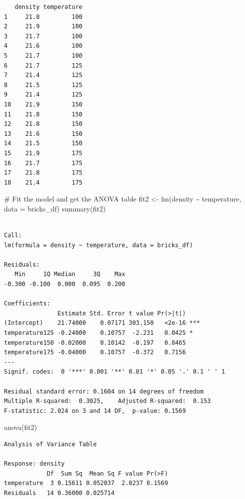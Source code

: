 \documentclass[
  letterpaper,
  DIV=11,
  numbers=noendperiod]{scrreprt}
\newenvironment{Shaded}{\begin{snugshade}}{\end{snugshade}}
\newcommand{\AttributeTok}[1]{\textcolor[rgb]{0.40,0.45,0.13}{#1}}
\newcommand{\CommentTok}[1]{\textcolor[rgb]{0.37,0.37,0.37}{#1}}
\newcommand{\FunctionTok}[1]{\textcolor[rgb]{0.28,0.35,0.67}{#1}}
\newcommand{\NormalTok}[1]{\textcolor[rgb]{0.00,0.23,0.31}{#1}}
\newcommand{\OtherTok}[1]{\textcolor[rgb]{0.00,0.23,0.31}{#1}}
\newcommand{\SpecialCharTok}[1]{\textcolor[rgb]{0.37,0.37,0.37}{#1}}
\begin{document}
\begin{verbatim}
   density temperature
1     21.8         100
2     21.9         100
3     21.7         100
4     21.6         100
5     21.7         100
6     21.7         125
7     21.4         125
8     21.5         125
9     21.4         125
10    21.9         150
11    21.8         150
12    21.8         150
13    21.6         150
14    21.5         150
15    21.9         175
16    21.7         175
17    21.8         175
18    21.4         175
\end{verbatim}

\begin{Shaded}
\begin{Highlighting}[]
\CommentTok{\# Fit the model and get the ANOVA table}
\NormalTok{fit2 }\OtherTok{\textless{}{-}} \FunctionTok{lm}\NormalTok{(density }\SpecialCharTok{\textasciitilde{}}\NormalTok{ temperature, }\AttributeTok{data =}\NormalTok{ bricks\_df)}
\FunctionTok{summary}\NormalTok{(fit2)}
\end{Highlighting}
\end{Shaded}

\begin{verbatim}

Call:
lm(formula = density ~ temperature, data = bricks_df)

Residuals:
   Min     1Q Median     3Q    Max 
-0.300 -0.100  0.000  0.095  0.200 

Coefficients:
               Estimate Std. Error t value Pr(>|t|)    
(Intercept)    21.74000    0.07171 303.150   <2e-16 ***
temperature125 -0.24000    0.10757  -2.231   0.0425 *  
temperature150 -0.02000    0.10142  -0.197   0.8465    
temperature175 -0.04000    0.10757  -0.372   0.7156    
---
Signif. codes:  0 '***' 0.001 '**' 0.01 '*' 0.05 '.' 0.1 ' ' 1

Residual standard error: 0.1604 on 14 degrees of freedom
Multiple R-squared:  0.3025,    Adjusted R-squared:  0.153 
F-statistic: 2.024 on 3 and 14 DF,  p-value: 0.1569
\end{verbatim}

\begin{Shaded}
\begin{Highlighting}[]
\FunctionTok{anova}\NormalTok{(fit2)}
\end{Highlighting}
\end{Shaded}

\begin{verbatim}
Analysis of Variance Table

Response: density
            Df  Sum Sq  Mean Sq F value Pr(>F)
temperature  3 0.15611 0.052037  2.0237 0.1569
Residuals   14 0.36000 0.025714               
\end{verbatim}
\end{document}
